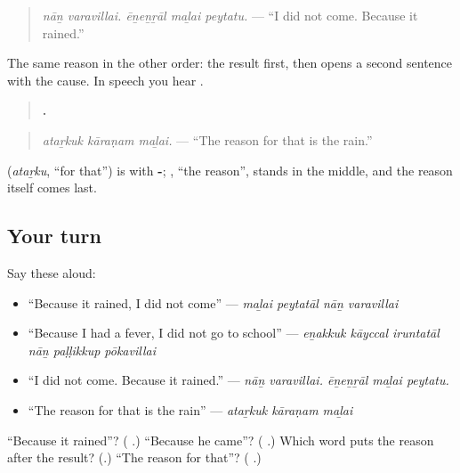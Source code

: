 \begin{quote}
\emph{nāṉ varavillai. ēṉeṉṟāl maḻai peytatu.} — \textquotedblleft{}I did not come. Because it rained.\textquotedblright{}
\end{quote}

The same reason in the other order: the result first, then \textbf{} opens a second sentence with the cause. In speech you hear \textbf{}.

\begin{quote}
\textbf{  .}
\end{quote}

\begin{quote}
\emph{ataṟkuk kāraṇam maḻai.} — \textquotedblleft{}The reason for that is the rain.\textquotedblright{}
\end{quote}

\textbf{} (\emph{ataṟku}, \textquotedblleft{}for that\textquotedblright{}) is \textbf{} with \textbf{-}; \textbf{}, \textquotedblleft{}the reason\textquotedblright{}, stands in the middle, and the reason itself comes last.

\subsection*{Your turn}
Say these aloud:

\begin{itemize}
\raggedright
  \item \textquotedblleft{}Because it rained, I did not come\textquotedblright{} — \emph{maḻai peytatāl nāṉ varavillai}
  \item \textquotedblleft{}Because I had a fever, I did not go to school\textquotedblright{} — \emph{eṉakkuk kāyccal iruntatāl nāṉ paḷḷikkup pōkavillai}
  \item \textquotedblleft{}I did not come. Because it rained.\textquotedblright{} — \emph{nāṉ varavillai. ēṉeṉṟāl maḻai peytatu.}
  \item \textquotedblleft{}The reason for that is the rain\textquotedblright{} — \emph{ataṟkuk kāraṇam maḻai}
\end{itemize}

\begin{tcolorbox}[breakable,colback=teal!4,colframe=teal!35!black,title={Before you move on}]
\textquotedblleft{}Because it rained\textquotedblright{}? (\textbf{ }.) \textquotedblleft{}Because he came\textquotedblright{}? (\textbf{ }.) Which word puts the reason after the result? (\textbf{}.) \textquotedblleft{}The reason for that\textquotedblright{}? (\textbf{ }.)
\end{tcolorbox}
